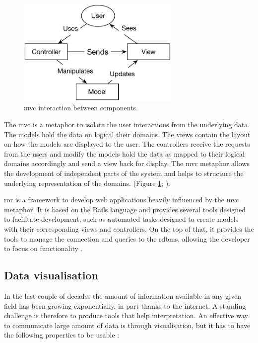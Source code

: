 \begin{figure} 
  \centering
  \includegraphics[width=0.7\textwidth]{LitReview/Figures/MVC.pdf}
  \caption{\acrshort{mvc} interaction between components.}
  \label{fig:poly:mvc}
\end{figure}
The \gls{mvc} is a metaphor to isolate the user interactions from the underlying data. 
The models hold the data on logical their domains.
The views contain the layout on how the models are displayed to the user.
The controllers receive the requests from the users and modify the models hold the data as mapped to their logical domains accordingly and send a view back for display. 
The \acrshort{mvc} metaphor allows the development of independent parts of the system and helps to structure the underlying representation of the domains.  (Figure \ref{fig:poly:mvc}; \citealt{Krasner1988}).

\gls{ror} is a framework to develop web applications heavily influenced by the \acrshort{mvc} metaphor. 
It is based on the Rails language and provides several tools designed to facilitate development, such as automated tasks designed to create models with their corresponding views and controllers. 
On the top of that, it provides the tools to manage the connection and queries to the \acrshort{rdbms}, allowing the developer to focus on functionality \citep{RailsGuide2016}. 

\subsection{Data visualisation}

In the last couple of decades the amount of information available in any given field has been growing exponentially, in part thanks to the internet. 
A standing challenge is therefore to produce tools that help interpretation. 
An effective way to communicate large amount of data is through visualisation, but it has to have the following properties to be usable \citep{Myatt2011}:

